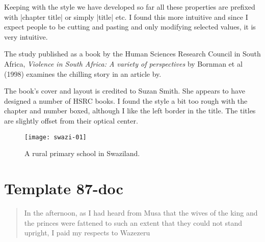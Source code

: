 Keeping with the style we have developed so far all these properties are prefixed with |chapter title| or simply |title|
etc. I found this more intuitive and since I expect people to be cutting and pasting and only modifying selected values, it is very intuitive. 







The study published as a book by the Human Sciences Research Council in South Africa, \textit{Violence in South Africa: A variety of perspectives} by Bornman et al (1998) examines the chilling story in an article by. 

The book’s cover and layout is credited to  Suzan Smith. She appears to have designed a number of HSRC books. I found the style a bit too rough with the chapter and number boxed, although I like the left border in the title. The titles are slightly offset from their optical center. 

\begin{figure}[ht]
\centering
\texttt{[image: swazi-01]}
\caption{A rural primary school in Swaziland.}
\end{figure}

\section{Template 87-doc}

\begin{quotation}
In the afternoon, as I had heard from Musa that the wives of the king and the  princes
were fattened to such an extent that they could not stand upright, I paid my respects to 
Wazezeru
\end{quotation}



 
